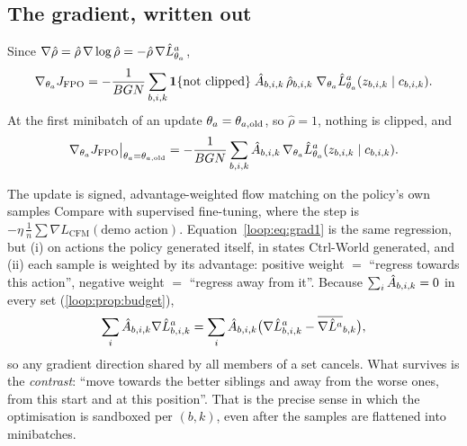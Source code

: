\subsection{The gradient, written out}
Since $\nabla\hat\rho=\hat\rho\,\nabla\log\hat\rho=-\hat\rho\,\nabla\hat L^{a}_{\theta_a}$,
\begin{equation}
\nabla_{\theta_a}J_{\mathrm{FPO}}=-\frac1{BGN}\sum_{b,i,k}\mathbf 1\{\text{not clipped}\}\;\hat A_{b,i,k}\,\hat\rho_{b,i,k}\;\nabla_{\theta_a}\hat L^{a}_{\theta_a}(z_{b,i,k}\mid c_{b,i,k}).
\label{loop:eq:grad}
\end{equation}
At the first minibatch of an update $\theta_a=\theta_{a,\mathrm{old}}$, so $\hat\rho=1$, nothing is clipped, and
\begin{equation}
\nabla_{\theta_a}J_{\mathrm{FPO}}\big|_{\theta_a=\theta_{a,\mathrm{old}}}=-\frac1{BGN}\sum_{b,i,k}\hat A_{b,i,k}\,\nabla_{\theta_a}\hat L^{a}_{\theta_a}(z_{b,i,k}\mid c_{b,i,k}).
\label{loop:eq:grad1}
\end{equation}
\begin{intuition}{The update is signed, advantage-weighted flow matching on the policy's own samples}
Compare with supervised fine-tuning, where the step is $-\eta\,\frac1n\sum\nabla L_{\mathrm{CFM}}(\text{demo action})$. Equation~\eqref{loop:eq:grad1} is the same regression, but (i) on actions the policy generated itself, in states Ctrl-World generated, and (ii) each sample is weighted by its advantage: positive weight $=$ ``regress towards this action'', negative weight $=$ ``regress away from it''. Because $\sum_i\hat A_{b,i,k}=0$ in every set (\cref{loop:prop:budget}),
\[
\sum_{i}\hat A_{b,i,k}\nabla\hat L^{a}_{b,i,k}=\sum_i\hat A_{b,i,k}\big(\nabla\hat L^{a}_{b,i,k}-\overline{\nabla\hat L^{a}}_{b,k}\big),
\]
so any gradient direction shared by all members of a set cancels. What survives is the \emph{contrast}: ``move towards the better siblings and away from the worse ones, from this start and at this position''. That is the precise sense in which the optimisation is sandboxed per $(b,k)$, even after the samples are flattened into minibatches.
\end{intuition}

